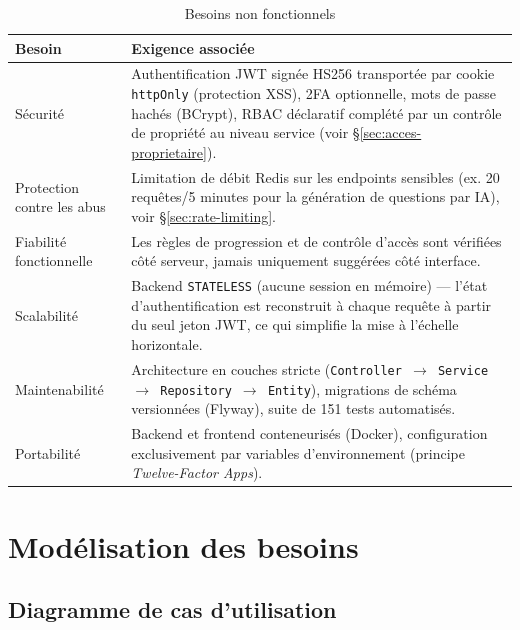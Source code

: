 \begin{table}[H]
\centering
\begin{tabular}{|p{3.5cm}|p{10.5cm}|}
\toprule
\textbf{Besoin} & \textbf{Exigence associée} \\
\midrule
Sécurité & Authentification JWT signée HS256 transportée par cookie
  \texttt{httpOnly} (protection XSS), 2FA optionnelle, mots de passe
  hachés (BCrypt), RBAC déclaratif complété par un contrôle de propriété
  au niveau service (voir \S\ref{sec:acces-proprietaire}). \\ \hline
Protection contre les abus & Limitation de débit Redis sur les endpoints
  sensibles (ex. 20 requêtes/5 minutes pour la génération de questions
  par IA), voir \S\ref{sec:rate-limiting}. \\ \hline
Fiabilité fonctionnelle & Les règles de progression et de contrôle
  d'accès sont vérifiées côté serveur, jamais uniquement suggérées côté
  interface. \\ \hline
Scalabilité & Backend \texttt{STATELESS} (aucune session en mémoire) ---
  l'état d'authentification est reconstruit à chaque requête à partir du
  seul jeton JWT, ce qui simplifie la mise à l'échelle horizontale. \\ \hline
Maintenabilité & Architecture en couches stricte (\texttt{Controller
  $\rightarrow$ Service $\rightarrow$ Repository $\rightarrow$ Entity}),
  migrations de schéma versionnées (Flyway), suite de 151 tests
  automatisés. \\ \hline
Portabilité & Backend et frontend conteneurisés (Docker), configuration
  exclusivement par variables d'environnement (principe \emph{Twelve-Factor
  Apps}). \\
\bottomrule
\end{tabular}
\caption{Besoins non fonctionnels}
\label{tab:bnf}
\end{table}

\section{Modélisation des besoins}
\label{sec:modelisation-besoins}

\subsection{Diagramme de cas d'utilisation}

